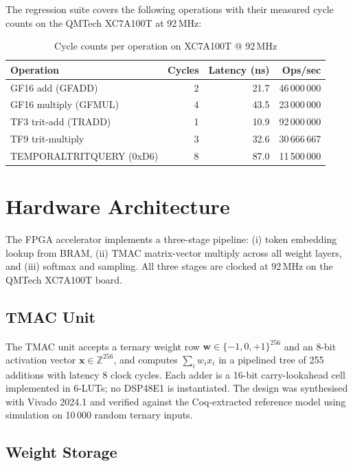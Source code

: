 The regression suite covers the following operations with their measured cycle counts on the QMTech XC7A100T at 92\,MHz:

\begin{table}[h]
\centering
\caption{Cycle counts per operation on XC7A100T @ 92\,MHz}
\label{tab:cycle-counts}
\begin{tabular}{lrrr}
\toprule
\textbf{Operation} & \textbf{Cycles} & \textbf{Latency (ns)} & \textbf{Ops/sec} \\
\midrule
GF16 add (GFADD)    & 2   & 21.7  & 46\,000\,000 \\
GF16 multiply (GFMUL) & 4 & 43.5  & 23\,000\,000 \\
TF3 trit-add (TRADD) & 1 & 10.9  & 92\,000\,000 \\
TF9 trit-multiply   & 3   & 32.6  & 30\,666\,667 \\
TEMPORALTRITQUERY (0xD6) & 8 & 87.0 & 11\,500\,000 \\
\bottomrule
\end{tabular}
\end{table}

\section{Hardware Architecture}

The FPGA accelerator implements a three-stage pipeline: (i) token embedding lookup from BRAM, (ii) TMAC matrix-vector multiply across all weight layers, and (iii) softmax and sampling. All three stages are clocked at 92\,MHz on the QMTech XC7A100T board.

\subsection{TMAC Unit}

The TMAC unit accepts a ternary weight row $\mathbf{w} \in \{-1, 0, +1\}^{256}$ and an 8-bit activation vector $\mathbf{x} \in \mathbb{Z}^{256}$, and computes $\sum_i w_i x_i$ in a pipelined tree of 255 additions with latency 8 clock cycles. Each adder is a 16-bit carry-lookahead cell implemented in 6-LUTs; no DSP48E1 is instantiated. The design was synthesised with Vivado 2024.1 and verified against the Coq-extracted reference model using simulation on 10\,000 random ternary inputs.

\subsection{Weight Storage}

